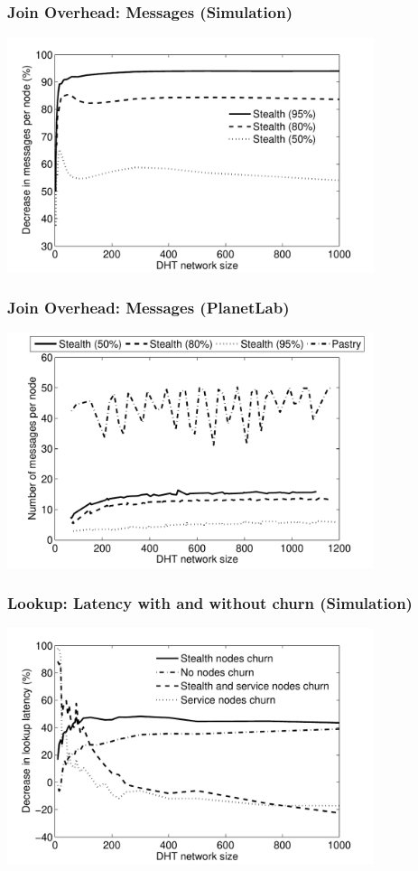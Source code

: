 \documentclass[xcolor=pdftex,dvipsnames,table]{beamer}
\begin{document}
\begin{frame}
    \frametitle{Join Overhead: Messages (Simulation)}
    \includegraphics[width=10.75cm]{diagrams/Fig4}
\end{frame}

\begin{frame}
    \frametitle{Join Overhead: Messages (PlanetLab)}
    \includegraphics[width=10.75cm]{diagrams/Fig13}
\end{frame}


\begin{frame}
    \frametitle{Lookup: Latency with and without churn (Simulation)}
    \includegraphics[width=10.75cm]{diagrams/Fig6}
\end{frame}
\end{document}
